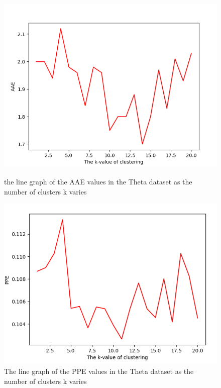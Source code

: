 \documentclass[conference,compsoc]{IEEEtran}
\begin{document}
\begin{figure}[H]
	\begin{minipage}[t]{0.45\linewidth}
		\includegraphics[width=\linewidth]{AAEInTheta.png} 
		\caption{the line graph of the AAE values in the Theta dataset as the number of clusters k varies} 
		\label{Fig:AAEInTheta}
	\end{minipage}%
	\hfill%
	\begin{minipage}[t]{0.45\linewidth}
		\includegraphics[width=\linewidth]{PPEInTheta.png}
		\caption{The line graph of the PPE values in the Theta dataset as the number of clusters k varies}
		\label{Fig:PPEInTheta}
	\end{minipage} 
\end{figure}
\end{document}
